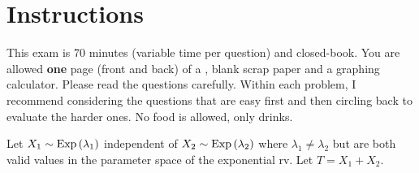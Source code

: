 \documentclass[12pt,landscape]{article}
\begin{document}
\section*{Instructions}
This exam is 70 minutes (variable time per question) and closed-book. You are allowed \textbf{one} page (front and back) of a , blank scrap paper and a graphing calculator. Please read the questions carefully. Within each problem, I recommend considering the questions that are easy first and then circling back to evaluate the harder ones. No food is allowed, only drinks. %

\pagebreak





\problem{} Let $X_1 \sim \mathrm{Exp}\left(\lambda_1\right)$ independent of $X_2 \sim \mathrm{Exp}\left(\lambda_2\right)$ where $\lambda_1 \neq \lambda_2$ but are both valid values in the parameter space of the exponential rv. Let $T = X_1 + X_2$.

\vspace{-0.2cm}\benum{} 
\end{document}
